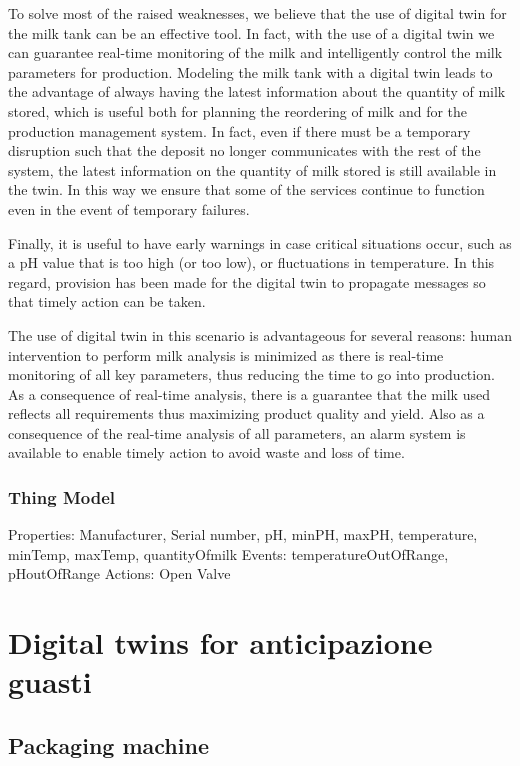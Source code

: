 To solve most of the raised weaknesses, we believe that the use of digital twin for the milk tank can be an effective tool.
In fact, with the use of a digital twin we can guarantee real-time monitoring of the milk and intelligently control the milk parameters for production.
Modeling the milk tank with a digital twin leads to the advantage of always having the latest information about the quantity of milk stored,
which is useful both for planning the reordering of milk and for the production management system.
In fact, even if there must be a temporary disruption such that the deposit no longer communicates with the rest of the system,
the latest information on the quantity of milk stored is still available in the twin.
In this way we ensure that some of the services continue to function even in the event of temporary failures.

Finally, it is useful to have early warnings in case critical situations occur, such as a pH value that is too high (or too low), or fluctuations in temperature.
In this regard, provision has been made for the digital twin to propagate messages so that timely action can be taken.

The use of digital twin in this scenario is advantageous for several reasons: human intervention to perform milk analysis is minimized as there is
real-time monitoring of all key parameters, thus reducing the time to go into production.
As a consequence of real-time analysis, there is a guarantee that the milk used reflects all requirements thus maximizing product quality and yield.
Also as a consequence of the real-time analysis of all parameters, an alarm system is available to enable timely action to avoid waste and loss of time.

\subsubsection{Thing Model}



Properties: Manufacturer, Serial number, pH, minPH, maxPH, temperature, minTemp, maxTemp, quantityOfmilk
Events: temperatureOutOfRange, pHoutOfRange
Actions: Open Valve

\section{Digital twins for anticipazione guasti}
\subsection{Packaging machine}
